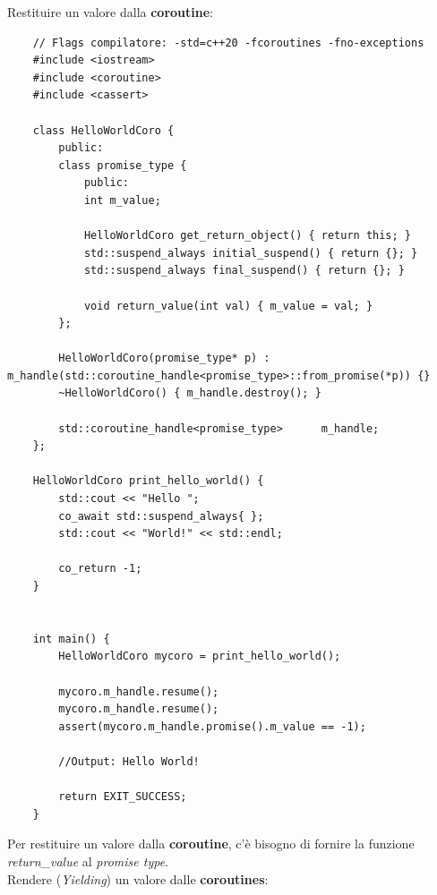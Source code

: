 \textsf{\small Restituire un valore dalla \textbf{coroutine}: } \\

\begin{lstlisting}
	// Flags compilatore: -std=c++20 -fcoroutines -fno-exceptions
	#include <iostream>
	#include <coroutine>
	#include <cassert>
	
	class HelloWorldCoro {
		public:
		class promise_type {
			public:
			int m_value;
			
			HelloWorldCoro get_return_object() { return this; }
			std::suspend_always initial_suspend() { return {}; }
			std::suspend_always final_suspend() { return {}; }
			
			void return_value(int val) { m_value = val; }
		};
		
		HelloWorldCoro(promise_type* p) : m_handle(std::coroutine_handle<promise_type>::from_promise(*p)) {}
		~HelloWorldCoro() { m_handle.destroy(); }
		
		std::coroutine_handle<promise_type>      m_handle;
	};
	
	HelloWorldCoro print_hello_world() {
		std::cout << "Hello ";
		co_await std::suspend_always{ };
		std::cout << "World!" << std::endl;
		
		co_return -1;
	}
	
	
	int main() {
		HelloWorldCoro mycoro = print_hello_world();
		
		mycoro.m_handle.resume();
		mycoro.m_handle.resume();
		assert(mycoro.m_handle.promise().m_value == -1);
		
		//Output: Hello World!
		
		return EXIT_SUCCESS;
	}
\end{lstlisting}

\textsf{\small Per restituire un valore dalla \textbf{coroutine}, c'è bisogno di fornire la funzione \emph{return\_value} al \emph{promise type}.} \\

\textsf{\small Rendere (\emph{Yielding}) un valore dalle \textbf{coroutines}: } \\

